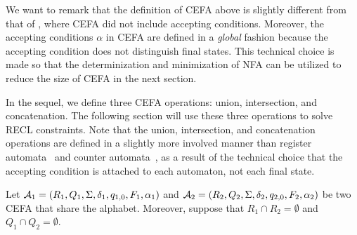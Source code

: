 We want to remark that the definition of CEFA above is slightly different from that of \cite{atva2020}, where CEFA did not include accepting conditions.
Moreover, the accepting conditions $\alpha$ in CEFA are defined in a \emph{global} fashion because the accepting condition does not distinguish final states. This technical choice is made so that the determinization and minimization of NFA can be utilized to reduce the size of CEFA in the next section. 

In the sequel, we define three CEFA operations: union, intersection, and concatenation. The following section will use these three operations to solve RECL constraints. Note that the union, intersection, and concatenation operations are defined in a slightly more involved manner than register automata~\cite{ra} and counter automata~\cite{GGM12}, as a result of the technical choice that the accepting condition is attached to each automaton, not each final state.

Let $\mathcal{A}_1 = (R_1, Q_1, \Sigma, \delta_1, q_{1,0}, F_1, \alpha_1)$ and  $\mathcal{A}_2 = (R_2, Q_2, \Sigma, \delta_2, q_{2,0}, F_2, \alpha_2)$ be two CEFA that share the alphabet. 
Moreover, suppose that $R_1 \cap R_2 = \emptyset$ and $Q_1 \cap Q_2 = \emptyset$. 

